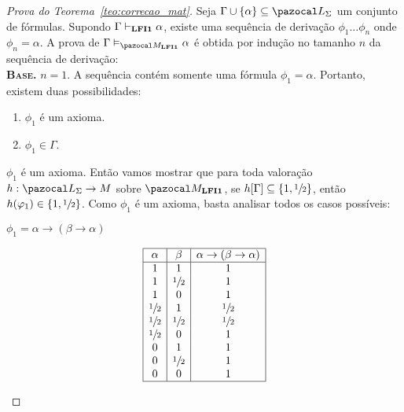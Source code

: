     \begin{proof}[Prova do Teorema~\ref{teo:correcao_mat}]
        Seja $\Gamma \cup \{\alpha\} \subseteq{} \ling{}$ um conjunto de fórmulas.
        Supondo $\Gamma \vdash_{{\normalfont\textbf{LFI1}}{}} \alpha$, existe uma sequência de derivação $\phi_{1} \ldots \phi_{n}$ onde $\phi_{n} = \alpha$. A prova de $\Gamma \conmat \alpha$ é obtida por indução no tamanho $n$ da sequência de derivação:\\

        \noindent \textbf{\textsc{Base.}} $n = 1$. A sequência contém somente uma fórmula $\phi_{1} = \alpha$. Portanto, existem duas possibilidades:
        \begin{enumerate}
            \item $\phi_{1}$ é um axioma.
            \item $\phi_{1} \in \Gamma$.
        \end{enumerate}

        \begin{provaporcasos}
            
            \casodeprova{} $\phi_{1}$ é um axioma. Então vamos mostrar que para toda valoração $h : \ling{} \to M$ sobre $\mat{}$, se $h[\Gamma] \subseteq \{1,\sfrac{1}{2}{}\}{}$, então $h(\varphi_{1}) \in \{1,\sfrac{1}{2}{}\}{}$. Como $\phi_{1}$ é um axioma, basta analisar todos os casos possíveis:

            \begin{provaporsubcasos}
                
                \subcasodeprova{} $\phi_{1} = \alpha \to (\beta \to \alpha)$
                    \begin{center}
                        \[
                            \begin{array}{|c|c|c|}%
                                \hline
                                \alpha      & \beta & \alpha \to (\beta \to \alpha)  \\
                                \hline%
                                1            & 1            &    1\\
                                1            & \meio{}  &    1\\
                                1            & 0            &    1\\
                                \meio{}  & 1            &    \meio{}\\
                                \meio{}  & \meio{}  &    \meio{}\\
                                \meio{}  & 0            &    1\\
                                0            & 1            &    1\\
                                0            & \meio{}  &    1\\
                                0            & 0            &    1\\
                                \hline
                            \end{array}
                        \]
                    \end{center}


\end{provaporsubcasos}
\end{provaporcasos}
\end{proof}

